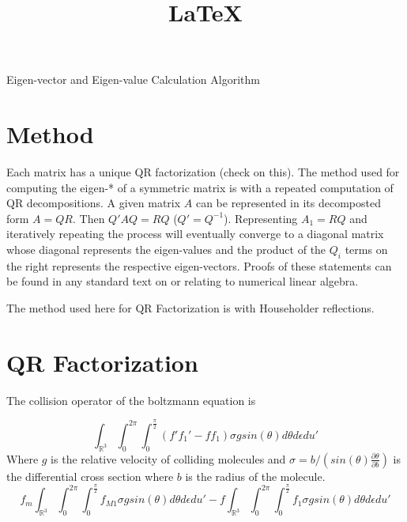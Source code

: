 \documentclass[11pt]{amsart}
\title{\LaTeX}
\date{}
\begin{document}
\begin{center}
Eigen-vector and Eigen-value Calculation Algorithm
\end{center}

\section{Method}
Each matrix has a unique QR factorization (check on this). The method used for computing the eigen-* of a symmetric matrix is with a repeated computation of QR decompositions. A given matrix $A$ can be represented in its decomposted form $A = QR$. Then $Q'AQ = RQ$ ($Q' = Q^{-1}$). Representing $A_1 = RQ$ and iteratively repeating the process will eventually converge to a diagonal matrix whose diagonal represents the eigen-values and the product of the $Q_i$ terms on the right represents the respective eigen-vectors.  Proofs of these statements can be found in any standard text on or relating to numerical linear algebra.

The method used here for QR Factorization is with Householder reflections.

\section{QR Factorization}
The collision operator of the boltzmann equation is

\begin{equation}
\label{BoltzmannRHS}
\int_{\mathbb{R}^3} \int_0^{2 \pi} \int_0^{\frac{\pi}{2}} \left( f' f_1' - f f_1 \right) \sigma g sin(\theta) d \theta d \epsilon d u'
\end{equation}
%
Where $g$ is the relative velocity of colliding molecules and $\sigma = b/(sin(\theta) \frac{\partial \theta}{\partial b})$ is the differential cross section where $b$ is the radius of the molecule.
\begin{equation*}
f_m \int_{\mathbb{R}^3} \int_0^{2 \pi} \int_0^{\frac{\pi}{2}} f_{M1} \sigma g sin(\theta) d \theta d \epsilon d u' - f \int_{\mathbb{R}^3} \int_0^{2 \pi} \int_0^{\frac{\pi}{2}} f_1 \sigma g sin(\theta) d \theta d \epsilon d u'
\end{equation*}
%
\end{document}
